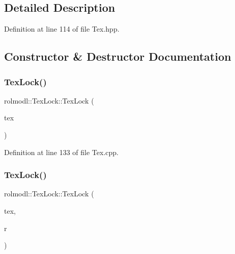 \subsection{Detailed Description}


Definition at line 114 of file Tex.\+hpp.



\subsection{Constructor \& Destructor Documentation}
\mbox{\label{classrolmodl_1_1texture_type_1_1_tex_lock_a45895d73fd7794d5012c87824b97068b}} 
\subsubsection{\texorpdfstring{TexLock()}{TexLock()}\hspace{0.1cm}{\footnotesize\ttfamily [1/5]}}
{\footnotesize\ttfamily rolmodl\+::\+Tex\+Lock\+::\+Tex\+Lock (\begin{DoxyParamCaption}\item[{\mbox{\hyperlink{classrolmodl_1_1texture_type_1_1_lock_tex}{Lock\+Tex}} \&}]{tex }\end{DoxyParamCaption})\hspace{0.3cm}{\ttfamily [explicit]}}



Definition at line 133 of file Tex.\+cpp.

\mbox{\label{classrolmodl_1_1texture_type_1_1_tex_lock_a21143b6a4a098af740429b2bd99ef4f2}} 
\subsubsection{\texorpdfstring{TexLock()}{TexLock()}\hspace{0.1cm}{\footnotesize\ttfamily [2/5]}}
{\footnotesize\ttfamily rolmodl\+::\+Tex\+Lock\+::\+Tex\+Lock (\begin{DoxyParamCaption}\item[{\mbox{\hyperlink{classrolmodl_1_1texture_type_1_1_lock_tex}{Lock\+Tex}} \&}]{tex,  }\item[{const \mbox{\hyperlink{structrolmodl_1_1geom_1_1_rect_w_h}{geom\+::\+Rect\+WH}}}]{r }\end{DoxyParamCaption})}



